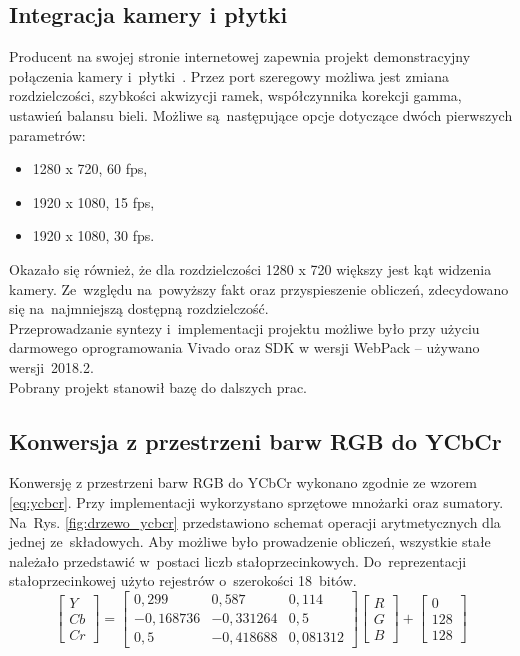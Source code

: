 \subsection{Integracja kamery i płytki}
\label{sec:integracja_uklad_kamera}
Producent na swojej stronie internetowej zapewnia projekt demonstracyjny połączenia kamery i~płytki~\cite{projektPCAM}. Przez port szeregowy możliwa jest zmiana rozdzielczości, szybkości akwizycji ramek, współczynnika korekcji gamma, ustawień balansu bieli. Możliwe są~następujące opcje dotyczące dwóch pierwszych parametrów:
\begin{itemize}
	\item 1280 x 720, 60 fps,
	\item 1920 x 1080, 15 fps,
	\item 1920 x 1080, 30 fps.
\end{itemize}
Okazało się również, że dla rozdzielczości 1280 x 720 większy jest kąt widzenia kamery. Ze~względu na~powyższy fakt oraz przyspieszenie obliczeń, zdecydowano się na~najmniejszą dostępną rozdzielczość.\\
Przeprowadzanie syntezy i~implementacji projektu możliwe było przy użyciu darmowego oprogramowania Vivado oraz SDK w wersji WebPack -- używano wersji~2018.2. \\
Pobrany projekt stanowił bazę do dalszych prac.
\subsection{Konwersja z przestrzeni barw RGB do YCbCr}
\label{subsec:konwersja}
Konwersję z przestrzeni barw RGB do YCbCr wykonano zgodnie ze wzorem \ref{eq:ycbcr}. 
Przy implementacji wykorzystano sprzętowe mnożarki oraz sumatory. Na~Rys. \ref{fig:drzewo_ycbcr} przedstawiono schemat operacji arytmetycznych dla jednej ze~składowych. Aby możliwe było prowadzenie obliczeń, wszystkie stałe należało przedstawić w~postaci liczb stałoprzecinkowych. Do~reprezentacji stałoprzecinkowej użyto rejestrów o~szerokości 18~bitów.
\begin{equation}
\label{eq:ycbcr}
\begin{bmatrix} Y \\ 
Cb\\
Cr
\end{bmatrix}=
\begin{bmatrix} 0,299 & 0,587 & 0,114\\ 
-0,168736 & -0,331264 & 0,5\\
0,5 & -0,418688 & 0,081312
\end{bmatrix}
\begin{bmatrix} R\\
G\\
B
\end{bmatrix}+
\begin{bmatrix} 0\\
128\\
128
\end{bmatrix}
\end{equation}


